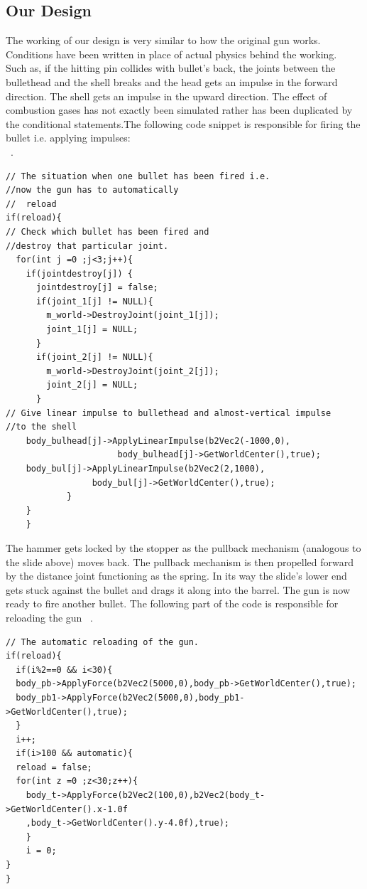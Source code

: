 \documentclass [11pt]{report}
\begin{document}
\subsection{Our Design}
The working of our design is very similar to how the original gun works. Conditions have been written in place of actual physics behind the working. \\
 Such as, if the hitting pin collides with bullet's back, the joints between the bullethead and the shell breaks and the head gets an impulse in the forward direction. The shell gets an impulse in the upward direction. The effect of combustion gases has not exactly been simulated rather has been duplicated by the conditional statements.The following code snippet is responsible for firing the bullet i.e. applying impulses:\\ 
 ~\cite{desjoint}.
 \begin{lstlisting}
// The situation when one bullet has been fired i.e. 
//now the gun has to automatically
//  reload
if(reload){
// Check which bullet has been fired and 
//destroy that particular joint.
  for(int j =0 ;j<3;j++){
    if(jointdestroy[j]) {
      jointdestroy[j] = false;
      if(joint_1[j] != NULL){
        m_world->DestroyJoint(joint_1[j]);
        joint_1[j] = NULL;
      }
      if(joint_2[j] != NULL){
        m_world->DestroyJoint(joint_2[j]);
        joint_2[j] = NULL;
      }
// Give linear impulse to bullethead and almost-vertical impulse 
//to the shell
    body_bulhead[j]->ApplyLinearImpulse(b2Vec2(-1000,0),
                      body_bulhead[j]->GetWorldCenter(),true);
    body_bul[j]->ApplyLinearImpulse(b2Vec2(2,1000),
                 body_bul[j]->GetWorldCenter(),true);
			}
	}
	}
\end{lstlisting} 
 
 The hammer gets locked by the stopper as the pullback mechanism (analogous to the slide above) moves back. The pullback mechanism is then propelled forward by the distance joint functioning as the spring. In its way the slide's lower end gets stuck against the bullet and drags it along into the barrel. The gun is now ready to fire another bullet. The following part of the code is responsible for reloading the gun
 ~\cite{force2d}.
\begin{lstlisting}
// The automatic reloading of the gun.
if(reload){
  if(i%2==0 && i<30){
  body_pb->ApplyForce(b2Vec2(5000,0),body_pb->GetWorldCenter(),true);
  body_pb1->ApplyForce(b2Vec2(5000,0),body_pb1->GetWorldCenter(),true);
  }
  i++;
  if(i>100 && automatic){
  reload = false;
  for(int z =0 ;z<30;z++){
    body_t->ApplyForce(b2Vec2(100,0),b2Vec2(body_t->GetWorldCenter().x-1.0f
    ,body_t->GetWorldCenter().y-4.0f),true);
	}
	i = 0;
}
}
\end{lstlisting} 
\end{document}
